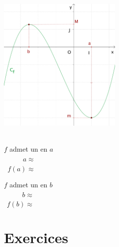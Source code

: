 \begin{minipage}[c]{0.4\linewidth}
  \centering
  \includegraphics[width=6cm]{F_Extrema}
\end{minipage}
\quad
\begin{minipage}[c]{0.4\linewidth}
  \centering
  \ \\
  $f$ admet un \hspace{2cm} en $a$  \\[2ex]
  $\phantom{f(a)}a\approx$ \\[2ex]
  $\phantom{a}f(a)\approx $ \\[2em]
  
  \bigskip

  $f$ admet un \hspace{2cm} en $b$  \\[2ex]
  $\phantom{f(b)}b\approx$ \\[2ex]
  $\phantom{b}f(b)\approx $   
\end{minipage}



\section{Exercices}


